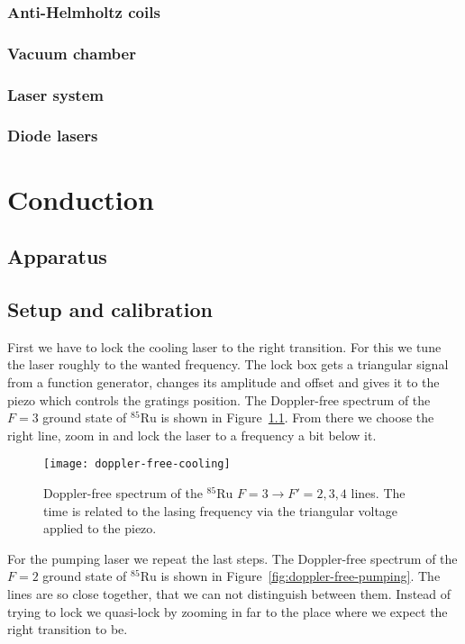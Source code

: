 \documentclass[11pt, english, fleqn, DIV=15, headinclude, BCOR=2cm]{scrreprt}
\begin{document}
\subsection{Anti-Helmholtz coils}

\subsection{Vacuum chamber}

\subsection{Laser system}

\subsection{Diode lasers}

\chapter{Conduction}

\section{Apparatus}

\section{Setup and calibration}

First we have to lock the cooling laser to the right transition. For this we
tune the laser roughly to the wanted frequency. The lock box gets a triangular
signal from a function generator, changes its amplitude and offset and gives it
to the piezo which controls the gratings position. The Doppler-free spectrum of
the $F=3$ ground state of ${}^{85}\text{Ru}$ is shown in
Figure~\ref{fig:doppler-free-cooling}. From there we choose the right line,
zoom in and lock the laser to a frequency a bit below it. 

\begin{figure}
    \centering
    \texttt{[image: doppler-free-cooling]}
    \caption{%
        Doppler-free spectrum of the ${}^{85}\text{Ru}$ $F=3 \to F'=2,3,4$
        lines. The time is related to the lasing frequency via the triangular
        voltage applied to the piezo.
    }
    \label{fig:doppler-free-cooling}
\end{figure}

For the pumping laser we repeat the last steps. The Doppler-free spectrum of the
$F=2$ ground state of ${}^{85}\text{Ru}$ is shown in
Figure~\ref{fig:doppler-free-pumping}. The lines are so close together, that we
can not distinguish between them. Instead of trying to lock we quasi-lock by
zooming in far to the place where we expect the right transition to be.
\end{document}
